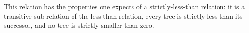   This relation has the properties one expects of a strictly-less-than
  relation: it is a transitive  sub-relation of the less-than relation,
  every tree is strictly less than its successor,
  and no tree is strictly smaller than zero.
\begin{code}%
%
\>[4]\AgdaSpace{}%
\AgdaSymbol{:}\AgdaSpace{}%
\AgdaSpace{}%
\AgdaSpace{}%
\AgdaSpace{}%
\AgdaSpace{}%
\AgdaSpace{}%
\AgdaSpace{}%
\<%
\\
%
\>[4]\AgdaSpace{}%
\AgdaSpace{}%
\AgdaSymbol{=}\AgdaSpace{}%
\<%
\\
%
\>[4]\AgdaSpace{}%
\AgdaSymbol{(}\AgdaSpace{}%
\AgdaSymbol{)}\AgdaSpace{}%
\AgdaSymbol{=}\AgdaSpace{}%
\AgdaSpace{}%
\AgdaSymbol{(}\AgdaSpace{}%
\AgdaSymbol{)}\<%
\\
%
\>[4]\AgdaSpace{}%
\AgdaSymbol{(}\AgdaSpace{}%
\AgdaSpace{}%
\AgdaSymbol{)}\<%
\\
\>[4][@{}l@{\AgdaIndent{0}}]%
\>[6]\AgdaSymbol{=}%
\>[360I]\AgdaSpace{}%
\AgdaSpace{}%
\AgdaSpace{}%
\AgdaSpace{}%
\<%
\\
\>[.][@{}l@{}]\<[360I]%
\>[8]\AgdaSymbol{(}\AgdaSpace{}%
\AgdaSymbol{(}\AgdaSpace{}%
\AgdaSymbol{))}\<%
\\
%
\>[8]\AgdaSpace{}%
\AgdaSymbol{(}\AgdaSpace{}%
\AgdaSymbol{(}\AgdaSpace{}%
\AgdaSpace{}%
\AgdaSpace{}%
\AgdaSymbol{(}\AgdaSpace{}%
\AgdaSymbol{(}\AgdaSpace{}%
\AgdaSymbol{))))}\<%
\end{code}


